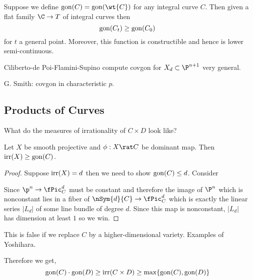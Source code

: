 \documentclass[12pt]{article}
\begin{document}
Suppose we define $\gon(C) = \gon(\wt{C})$ for any integral curve $C$. Then given a flat family $\C \to T$ of integral curves then
\[ \mathrm{gon}(C_t) \ge \mathrm{gon}(C_0) \]
for $t$ a general point. Moreover, this function is constructible and hence is lower semi-continuous. 

\begin{rmk}
Ciliberto-de Poi-Flamini-Supino compute covgon for $X_d \subset \P^{n+1}$ very general. 
\end{rmk}

\begin{rmk}
G. Smith: covgon in characteristic $p$.
\end{rmk}

\subsection{Products of Curves}

What do the measures of irrationality of $C \times D$ look like?

\begin{lemma}
Let $X$ be smooth projective and $\phi : X \rat C$ be dominant map. Then $\mathrm{irr}(X) \ge \mathrm{gon}(C)$.
\end{lemma}

\begin{proof}
Suppose $\mathrm{irr}(X) = d$ then we need to show $\mathrm{gon}(C) \le d$. Consider 
\begin{center}
\end{center}
Since $\p^n \to \fPic^d_C$ must be constant and therefore the image of $\P^n$ which is nonconstant lies in a fiber of $\nSym{d}{C} \to \fPic^d_C$ which is exactly the linear series $|L_d|$ of some line bundle of degree $d$. Since this map is nonconstant, $|L_d|$ has dimension at least $1$ so we win.
\end{proof}

\begin{rmk}
This is false if we replace $C$ by a higher-dimensional variety. Examples of Yoshihara. 
\end{rmk}

Therefore we get,
\[ \mathrm{gon}(C) \cdot \mathrm{gon}(D) \ge \mathrm{irr}(C \times D) \ge \max \{ \mathrm{gon}(C), \mathrm{gon}(D) \} \]
\end{document}
